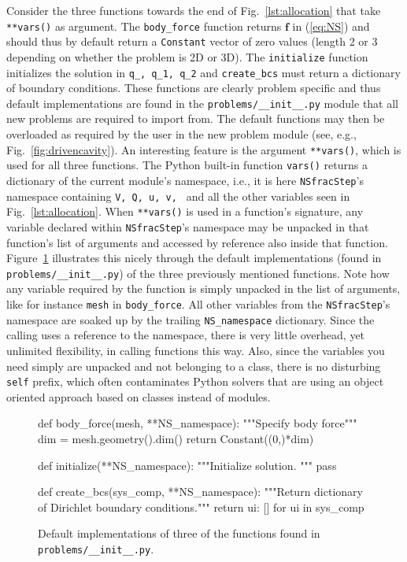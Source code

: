 \documentclass[final,3p,times,twocolumn]{elsarticle}
\newcommand{\inpyth}{\lstinline[style=inlinestyle]} %[]%
\begin{document}
Consider the three functions towards the end of Fig.~\ref{lst:allocation} that take \inpyth{**vars()} as argument. The \inpyth{body_force} function returns $\bm{f}$ in (\ref{eq:NS}) and should thus by default return a \inpyth{Constant} vector of zero values (length 2 or 3 depending on whether the problem is 2D or 3D). The \inpyth{initialize} function initializes the solution in \inpyth{q_, q_1, q_2} and \inpyth{create_bcs} must return a dictionary of boundary conditions. These functions are clearly problem specific and thus default implementations are found in the \inpyth{problems/__init__.py} module that all new problems are required to import from. The default functions may then be overloaded as required by the user in the new problem module (see, e.g., Fig.~\ref{fig:drivencavity}). An interesting feature is the argument \inpyth{**vars()}, which is used for all three functions. The Python built-in function \inpyth{vars()} returns a dictionary of the current module's namespace, i.e., it is here \inpyth{NSfracStep}'s namespace containing \inpyth{V, Q, u, v, } and all the other variables seen in Fig.~\ref{lst:allocation}. When \inpyth{**vars()} is used in a function's signature, any variable declared within \inpyth{NSfracStep}'s namespace may be unpacked in that function's list of arguments and accessed by reference also inside that function. Figure~\ref{lst:defaulthooks} illustrates this nicely through the default implementations (found in \inpyth{problems/__init__.py}) of the three previously mentioned functions. Note how any variable required by the function is simply unpacked in the list of arguments, like for instance \inpyth{mesh}{} in \inpyth{body_force}. All other variables from the \inpyth{NSfracStep}'s namespace are soaked up by the trailing \inpyth{NS_namespace} dictionary. Since the calling uses a reference to the namespace, there is very little overhead, yet unlimited flexibility, in calling functions this way. Also, since the variables you need simply are unpacked and not belonging to a class, there is no disturbing \inpyth{self} prefix, which often contaminates Python solvers that are using an object oriented approach based on classes instead of modules.
\begin{figure}
\begin{python}
def body_force(mesh, **NS_namespace):
  """Specify body force"""
  dim = mesh.geometry().dim()
  return Constant((0,)*dim)

def initialize(**NS_namespace):
  """Initialize solution. """
  pass

def create_bcs(sys_comp, **NS_namespace):
  """Return dictionary of Dirichlet
  boundary conditions."""
  return {ui: [] for ui in sys_comp}
\end{python}
\caption{Default implementations of three of the functions found in \inpyth{problems/__init__.py}{}. }
\label{lst:defaulthooks}
\end{figure}
\end{document}
